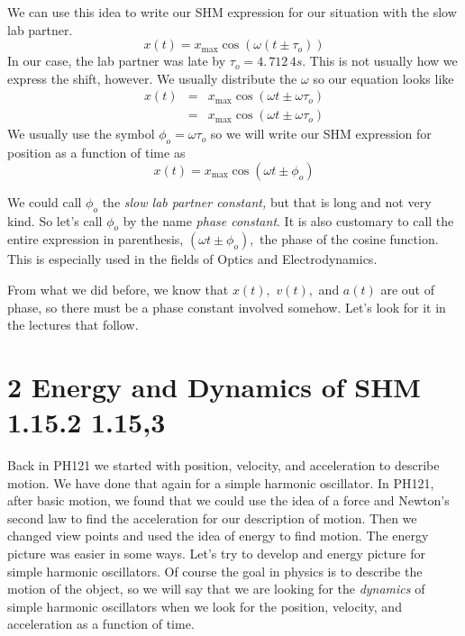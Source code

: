 \documentclass{book}
\begin{document}
We can use this idea to write our SHM expression for our situation with the
slow lab partner. 
\begin{equation*}
x\left( t\right) =x_{\max }\cos \left( \omega \left( t\pm \tau _{o}\right)
\right)
\end{equation*}%
In our case, the lab partner was late by $\tau _{o}=\allowbreak
4.\,\allowbreak 712\,4\unit{s}.$ This is not usually how we express the
shift, however. We usually distribute the $\omega $ so our equation looks
like%
\begin{eqnarray*}
x\left( t\right) &=&x_{\max }\cos \left( \omega t\pm \omega \tau _{o}\right)
\\
&=&x_{\max }\cos \left( \omega t\pm \omega \tau _{o}\right)
\end{eqnarray*}%
We usually use the symbol $\phi _{o}=\omega \tau _{o}$ so we will write our
SHM expression for position as a function of time as%
\begin{equation*}
x\left( t\right) =x_{\max }\cos \left( \omega t\pm \phi _{o}\right)
\end{equation*}

We could call $\phi _{o}$ the \emph{slow lab partner constant, }but that is
long and not very kind. So let's call $\phi _{o}$ by the name \emph{phase
constant}. It is also customary to call the entire expression in
parenthesis, $\left( \omega t\pm \phi _{o}\right) ,$ the phase of the cosine
function. This is especially used in the fields of Optics and
Electrodynamics.

From what we did before, we know that $x\left( t\right) ,$ $v\left( t\right)
,$ and $a\left( t\right) $ are out of phase, so there must be a phase
constant involved somehow. Let's look for it in the lectures that follow.

\chapter{2 Energy and Dynamics of SHM 1.15.2 1.15,3}

%

Back in PH121 we started with position, velocity, and acceleration to
describe motion. We have done that again for a simple harmonic oscillator.
In PH121, after basic motion, we found that we could use the idea of a force
and Newton's second law to find the acceleration for our description of
motion. Then we changed view points and used the idea of energy to find
motion. The energy picture was easier in some ways. Let's try to develop and
energy picture for simple harmonic oscillators. Of course the goal in
physics is to describe the motion of the object, so we will say that we are
looking for the \emph{dynamics} of simple harmonic oscillators when we look
for the position, velocity, and acceleration as a function of time.
\end{document}
